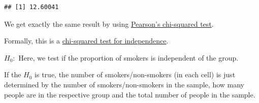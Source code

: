 \documentclass[
]{book}
\newenvironment{Shaded}{\begin{snugshade}}{\end{snugshade}}
\newcommand{\DecValTok}[1]{\textcolor[rgb]{0.00,0.00,0.81}{#1}}
\newcommand{\FunctionTok}[1]{\textcolor[rgb]{0.13,0.29,0.53}{\textbf{#1}}}
\newcommand{\NormalTok}[1]{#1}
\newcommand{\OtherTok}[1]{\textcolor[rgb]{0.56,0.35,0.01}{#1}}
\newcommand{\SpecialCharTok}[1]{\textcolor[rgb]{0.81,0.36,0.00}{\textbf{#1}}}
\newcommand{\StringTok}[1]{\textcolor[rgb]{0.31,0.60,0.02}{#1}}
\begin{document}
\begin{verbatim}
## [1] 12.60041
\end{verbatim}

We get exactly the same result by using
\href{https://en.wikipedia.org/wiki/Pearson\%27s_chi-squared_test}{Pearson's chi-squared test}.

Formally, this is a \href{https://en.wikipedia.org/wiki/Chi-squared_test\#Test_of_independence}{chi-squared test for independence}.

\(H_0:\) Here, we test if the proportion of smokers is independent of the group.

If the \(H_0\) is true, the number of smokers/non-smokers (in each cell) is just determined
by the number of smokers/non-smokers
in the sample, how many people are in the respective group and the total number
of people in the sample.

\begin{Shaded}
\end{Shaded}
\end{document}
